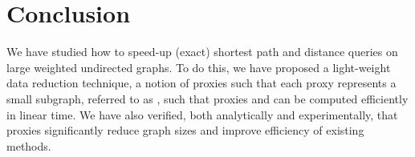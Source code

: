 \section{Conclusion}
\label{sec-con}

We have studied how to speed-up (exact)  shortest path and distance queries on large weighted undirected graphs.
To do this, we have proposed  a light-weight data reduction technique, a notion of proxies such that each proxy represents a small subgraph, referred to as \dras, such that proxies and \dras can be computed efficiently in linear time.  We have also verified,
both analytically and experimentally, that proxies significantly reduce graph sizes and improve efficiency of existing methods.


